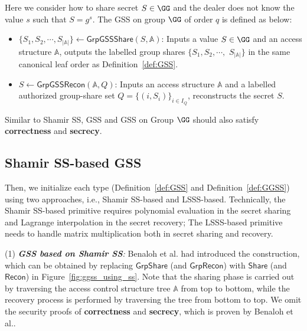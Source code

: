 \documentclass[runningheads]{llncs}
\newcommand{\shamirShare}{\mathsf{Share}}
\newcommand{\shamirRecon}{\mathsf{Recon}}
\newcommand{\shamirGShare}{\mathsf{GrpShare}}
\newcommand{\shamirGRecon}{\mathsf{GrpRecon}}
\newcommand{\ggssshare}{\mathsf{GrpGSSShare}}
\newcommand{\ggssrecon}{\mathsf{GrpGSSRecon}}
\begin{document}
\begin{definition}\label{def:GGSS}
Here we consider how to share secret $S\in\GG$ and the dealer does not know the value $s$ such that $S=g^s$. The GSS on group $\GG$ of order $q$ is defined as below:
\begin{itemize}
    \item $\{{S_1},{S_2},\cdots,{S_{|\mathbb{A}|}}\} \gets \ggssshare (S, \mathbb{A})$: Inputs a value $S\in\GG$ and an access structure $\mathbb{A}$, outputs the labelled group shares $\{{S_1},{S_2},\cdots,$ ${S_{|\mathbb{A}|}}\}$ in the same canonical leaf order as Definition~\ref{def:GSS}.
    \item $S\gets \ggssrecon(\mathbb{A}, Q)$: Inputs an access structure $\mathbb{A}$ and a labelled authorized group-share set $Q=\{(i,S_i)\}_{i\in I_Q}$, reconstructs the secret $S$.
\end{itemize}
\end{definition}

Similar to Shamir SS, GSS and GSS on Group $\GG$ should also satisfy \textbf{correctness} and \textbf{secrecy}.





\subsection{Shamir SS-based GSS}
\label{sec:gss_basedon_sss}
Then, we initialize each type (Definition~\ref{def:GSS} and Definition~\ref{def:GGSS}) using two approaches, i.e., Shamir SS-based and LSSS-based.
Technically, the Shamir SS-based primitive requires polynomial evaluation in the secret sharing and Lagrange interpolation in the secret recovery; The LSSS-based primitive needs to handle matrix multiplication both in secret sharing and recovery.


    (1) \emph{\textbf{GSS based on Shamir SS}:} Benaloh et al.\cite{benaloh1990generalized} had introduced the construction, which can be obtained by replacing $\shamirGShare$ (and $\shamirGRecon$) with $\shamirShare$ (and $\shamirRecon$) in Figure~\ref{fig:ggss_using_ss}.
    Note that the sharing phase is carried out by traversing the access control structure tree $\mathbb{A}$ from top to bottom, while the recovery process is performed by traversing the tree from bottom to top.
    We omit the security proofs of \textbf{correctness} and \textbf{secrecy}, which is proven by Benaloh et al.\cite{benaloh1990generalized}.
\end{document}
